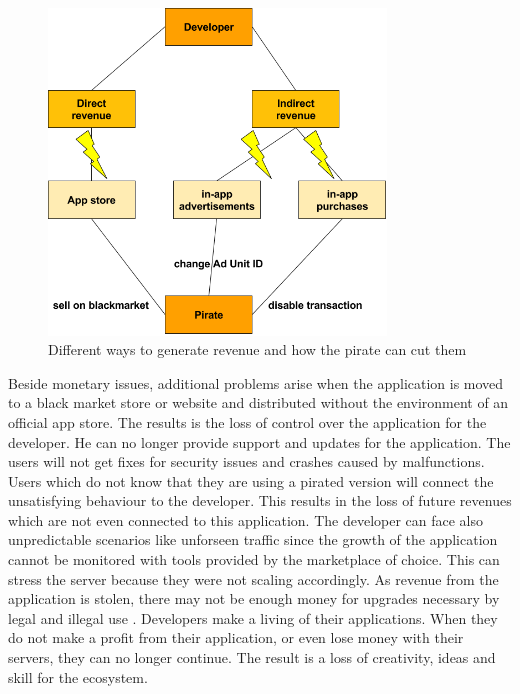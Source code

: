 \begin{figure}[h]
    \centering
    \includegraphics[width=0.8\textwidth]{data/revenue.png}
    \caption{Different ways to generate revenue and how the pirate can cut them}
    \label{fig:revenue}
\end{figure}
Beside monetary issues, additional problems arise when the application is moved to a black market store or website and distributed without the environment of an official app store.
The results is the loss of control over the application for the developer.
He can no longer provide support and updates for the application.
The users will not get fixes for security issues and crashes caused by malfunctions.
Users which do not know that they are using a pirated version will connect the unsatisfying behaviour to the developer.
This results in the loss of future revenues which are not even connected to this application.
\newline
The developer can face also unpredictable scenarios like unforseen traffic since the growth of the application cannot be monitored with tools provided by the marketplace of choice.
This can stress the server because they were not scaling accordingly.
As revenue from the application is stolen, there may not be enough money for upgrades necessary by legal and illegal use \cite{lierschDeveloperThreats}.
\newline
Developers make a living of their applications.
When they do not make a profit from their application, or even lose money with their servers, they can no longer continue.
The result is a loss of creativity, ideas and skill for the ecosystem.
